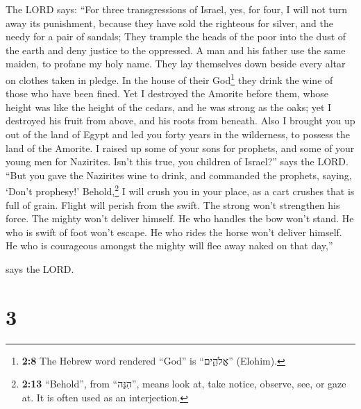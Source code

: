  The LORD says: ``For three transgressions of Israel, yes,
for four, I will not turn away its punishment, because they have sold
the righteous for silver, and the needy for a pair of sandals;
 They trample the heads of the poor into the dust of the
earth and deny justice to the oppressed. A man and his father use the
same maiden, to profane my holy name.  They lay themselves
down beside every altar on clothes taken in pledge. In the house of
their God\footnote{\textbf{2:8} The Hebrew word rendered ``God'' is
  ``אֱלֹהִ֑ים'' (Elohim).} they drink the wine of those who have been
fined.  Yet I destroyed the Amorite before them, whose
height was like the height of the cedars, and he was strong as the oaks;
yet I destroyed his fruit from above, and his roots from beneath.
 Also I brought you up out of the land of Egypt and led
you forty years in the wilderness, to possess the land of the Amorite.
 I raised up some of your sons for prophets, and some of
your young men for Nazirites. Isn't this true, you children of Israel?''
says the LORD.  ``But you gave the Nazirites wine to
drink, and commanded the prophets, saying, `Don't prophesy!'
 Behold,\footnote{\textbf{2:13} ``Behold'', from
  ``הִנֵּה'', means look at, take notice, observe, see, or gaze at. It
  is often used as an interjection.} I will crush you in your place, as
a cart crushes that is full of grain.  Flight will perish
from the swift. The strong won't strengthen his force. The mighty won't
deliver himself.  He who handles the bow won't stand. He
who is swift of foot won't escape. He who rides the horse won't deliver
himself.  He who is courageous amongst the mighty will
flee away naked on that day,''

says the LORD.

\hypertarget{section-2}{%
\section{3}\label{section-2}}

